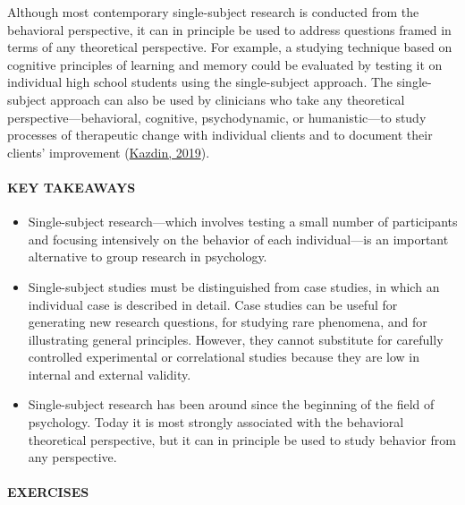\documentclass[
]{krantz}
\providecommand{\tightlist}{%
  \setlength{\itemsep}{0pt}\setlength{\parskip}{0pt}}
\begin{document}
Although most contemporary single-subject research is conducted from the behavioral perspective, it can in principle be used to address questions framed in terms of any theoretical perspective. For example, a studying technique based on cognitive principles of learning and memory could be evaluated by testing it on individual high school students using the single-subject approach. The single-subject approach can also be used by clinicians who take any theoretical perspective---behavioral, cognitive, psychodynamic, or humanistic---to study processes of therapeutic change with individual clients and to document their clients' improvement (\protect\hyperlink{ref-kazdin2019single}{Kazdin, 2019}).

\hypertarget{key-takeaways-26}{%
\paragraph*{KEY TAKEAWAYS}\label{key-takeaways-26}}

\begin{itemize}
\tightlist
\item
  Single-subject research---which involves testing a small number of participants and focusing intensively on the behavior of each individual---is an important alternative to group research in psychology.
\item
  Single-subject studies must be distinguished from case studies, in which an individual case is described in detail. Case studies can be useful for generating new research questions, for studying rare phenomena, and for illustrating general principles. However, they cannot substitute for carefully controlled experimental or correlational studies because they are low in internal and external validity.
\item
  Single-subject research has been around since the beginning of the field of psychology. Today it is most strongly associated with the behavioral theoretical perspective, but it can in principle be used to study behavior from any perspective.
\end{itemize}

\hypertarget{exercises-22}{%
\paragraph*{EXERCISES}\label{exercises-22}}
\end{document}
